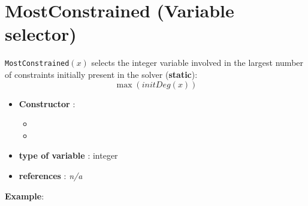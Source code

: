 \section{MostConstrained (Variable selector)}\label{mostconstrained:mostconstrainedvarselector}\hypertarget{mostconstrained:mostconstrainedvarselector}{}
\begin{notedef}
  \texttt{MostConstrained}$(x)$ selects the integer variable involved in the largest number of constraints initially present in the solver (\textbf{static}):
$$\max(initDeg(x))$$
\end{notedef}

\begin{itemize}
	\item \textbf{Constructor} : 
	\begin{itemize}
	\item {}
	\item {}
	\end{itemize}	
	\item \textbf{type of variable} : integer
	\item \textbf{references} : \emph{n/a}
\end{itemize}

\textbf{Example}:
%

